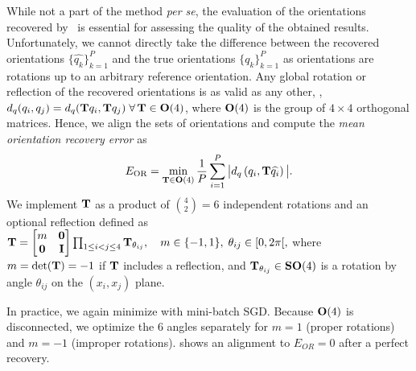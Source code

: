 While not a part of the method \textit{per se}, the evaluation of the orientations recovered by~ is essential for assessing the quality of the obtained results.
Unfortunately, we cannot directly take the difference between the recovered orientations $\{\widehat{q_k}\}_{k=1}^P$ and the true orientations $\{q_k\}_{k=1}^P$ as orientations are rotations up to an arbitrary reference orientation.
Any global rotation or reflection of the recovered orientations is as valid as any other, \ie, $d_q(q_i, q_j) = d_q(\mathbf{T} q_i , \mathbf{T} q_j) \; \forall \, \mathbf{T} \in \mathrm{\mathbf{O}}(4)$, where $\mathrm{\mathbf{O}}(4)$ is the group of $4 \times 4$ orthogonal matrices. %
Hence, we align the sets of orientations and compute the \textit{mean orientation recovery error} as
\begin{equation}
    E_\text{OR} = \min_{\mathbf{T} \in \mathrm{\mathbf{O}}(4)} \frac{1}{P} \sum_{i=1}^P \big| d_q\left( q_i, \mathbf{T} \widehat{q_i} \right) \big|.
    \label{eqn:orientation-recovery-error}
\end{equation}
We implement $\mathbf{T}$ as a product of $\binom{4}{2}=6$ independent rotations and an optional reflection defined as 
$
    \mathbf{T} =
    \begin{bmatrix}
        m & \mathbf{0} \\
        \mathbf{0} & \mathbf{I} \\
    \end{bmatrix}
    \prod_{1 \leq i < j \leq 4} \mathbf{T}_{\theta_{ij}},
    \quad m \in \{-1,1\}, \; \theta_{ij} \in [0, 2\pi[,
$
where $m = \det(\mathbf{T}) = -1$ if $\mathbf{T}$ includes a reflection, and $\mathbf{T}_{\theta_{ij}} \in \mathrm{\mathbf{SO}}(4)$ is a rotation by angle $\theta_{ij}$ on the $(x_i, x_j)$ plane.

In practice, we again minimize  with mini-batch SGD.
Because $\mathrm{\mathbf{O}}(4)$ is disconnected, we optimize the 6 angles separately for $m = 1$ (proper rotations) and $m = -1$ (improper rotations).
 shows an alignment to $E_{OR}=0$ after a perfect recovery.

